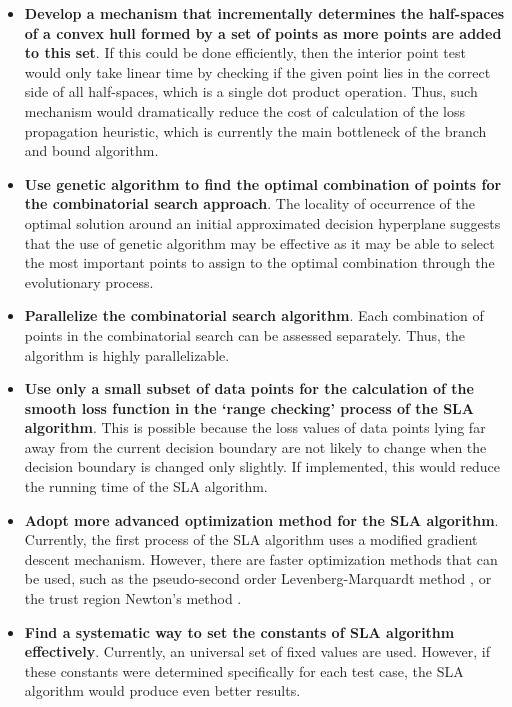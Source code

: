 \begin{itemize}

\item {\bf Develop a mechanism that incrementally determines the half-spaces of a convex hull formed by a set of points as more points are added to this set}. If this could be done efficiently, then the interior point test would only take linear time by checking if the given point lies in the correct side of all half-spaces, which is a single dot product operation. Thus, such mechanism would dramatically reduce the cost of calculation of the loss propagation heuristic, which is currently the main bottleneck of the branch and bound algorithm.

\item {\bf Use genetic algorithm to find the optimal combination of points for the combinatorial search approach}. The locality of occurrence of the optimal solution around an initial approximated decision hyperplane suggests that the use of genetic algorithm may be effective as it may be able to select the most important points to assign to the optimal combination through the evolutionary process. 

\item {\bf Parallelize the combinatorial search algorithm}. Each combination of points in the combinatorial search can be assessed separately. Thus, the algorithm is highly parallelizable. 

\item {\bf Use only a small subset of data points for the calculation of the smooth loss function in the `range checking' process of the SLA algorithm}. This is possible because the loss values of data points lying far away from the current decision boundary are not likely to change when the decision boundary is changed only slightly. If implemented, this would reduce the running time of the SLA algorithm.

\item {\bf Adopt more advanced optimization method for the SLA algorithm}. Currently, the first process of the SLA algorithm uses a modified gradient descent mechanism. However, there are faster optimization methods that can be used, such as the pseudo-second order Levenberg-Marquardt method \cite{Marquardt}, or the trust region Newton's method  \cite{Steihaug}.

\item {\bf Find a systematic way to set the constants of SLA algorithm effectively}. Currently, an universal set of fixed values are used. However, if these constants were determined specifically for each test case, the SLA algorithm would produce even better results.


\end{itemize}
